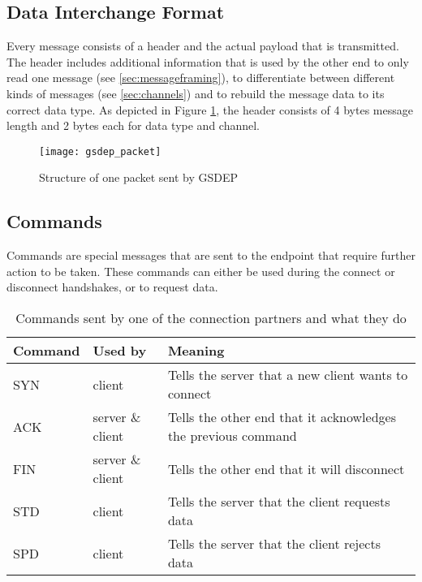 \subsection{Data Interchange Format}

Every message consists of a header and the actual payload that is transmitted. The header includes additional information that is used by the other end to only read one message (see \ref{sec:messageframing}), to differentiate between different kinds of messages (see \ref{sec:channels}) and to rebuild the message data to its correct data type. As depicted in Figure \ref{fig:packet}, the header consists of 4 bytes message length and 2 bytes each for data type and channel.

\begin{figure}[H]
	\centering
	\texttt{[image: gsdep\_packet]}
	\caption{Structure of one packet sent by GSDEP}
	\label{fig:packet}
\end{figure}

\subsection{Commands}
\label{sec:networking_command}

Commands are special messages that are sent to the endpoint that require further action to be taken. These commands can either be used during the connect or disconnect handshakes, or to request data.

\begin{table}[H]
	\centering
	\begin{tabular}{| l | l | p{5cm} |}
	\hline
	\textbf{Command} & \textbf{Used by} & \textbf{Meaning} \\ \hline
	SYN & client & Tells the server that a new client wants to connect \\ \hline
	ACK & server \& client & Tells the other end that it acknowledges the previous command \\ \hline
	FIN & server \& client & Tells the other end that it will disconnect \\ \hline
	STD & client & Tells the server that the client requests data\\ \hline
	SPD & client & Tells the server that the client rejects data\\
	\hline
	\end{tabular}
	\caption{Commands sent by one of the connection partners and what they do}
	\label{tab:commands}
\end{table}

